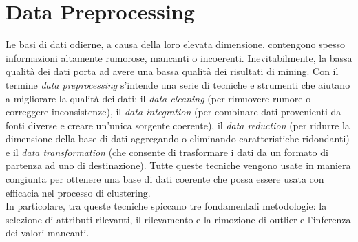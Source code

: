 \section{Data Preprocessing}
Le basi di dati odierne, a causa della loro elevata dimensione, contengono spesso informazioni altamente rumorose, mancanti o incoerenti. Inevitabilmente, la bassa qualit\`a dei dati porta ad avere una bassa qualit\`a dei risultati di mining. Con il termine \textit{data preprocessing} s'intende una serie di tecniche e strumenti che aiutano a migliorare la qualit\`a dei dati: il \textit{data cleaning} (per rimuovere rumore o correggere inconsistenze), il \textit{data integration} (per combinare dati provenienti da fonti diverse e creare un'unica sorgente coerente), il \textit{data reduction}  (per ridurre la dimensione della base di dati aggregando o eliminando caratteristiche ridondanti) e il \textit{data transformation} (che consente di trasformare i dati da un formato di partenza ad uno di destinazione).
Tutte queste tecniche vengono usate in maniera congiunta per ottenere una base di dati coerente che possa essere usata con efficacia nel processo di clustering.\\
In particolare, tra queste tecniche spiccano tre fondamentali metodologie: la selezione di attributi rilevanti, il rilevamento e la rimozione di outlier e l'inferenza dei valori mancanti.

